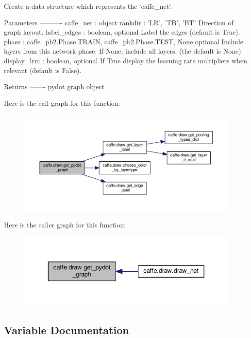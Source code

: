 \begin{DoxyVerb}Create a data structure which represents the `caffe_net`.

Parameters
----------
caffe_net : object
rankdir : {'LR', 'TB', 'BT'}
    Direction of graph layout.
label_edges : boolean, optional
    Label the edges (default is True).
phase : {caffe_pb2.Phase.TRAIN, caffe_pb2.Phase.TEST, None} optional
    Include layers from this network phase.  If None, include all layers.
    (the default is None)
display_lrm : boolean, optional
    If True display the learning rate multipliers when relevant (default is
    False).

Returns
-------
pydot graph object
\end{DoxyVerb}
 Here is the call graph for this function\+:
\nopagebreak
\begin{figure}[H]
\begin{center}
\leavevmode
\includegraphics[width=350pt]{namespacecaffe_1_1draw_a679642bc8af6fb5382480cfad0c27111_cgraph}
\end{center}
\end{figure}
Here is the caller graph for this function\+:
\nopagebreak
\begin{figure}[H]
\begin{center}
\leavevmode
\includegraphics[width=329pt]{namespacecaffe_1_1draw_a679642bc8af6fb5382480cfad0c27111_icgraph}
\end{center}
\end{figure}


\subsection{Variable Documentation}
\mbox{\label{namespacecaffe_1_1draw_ab9680300b4ad475d87181a74cdad3d7f}} 
